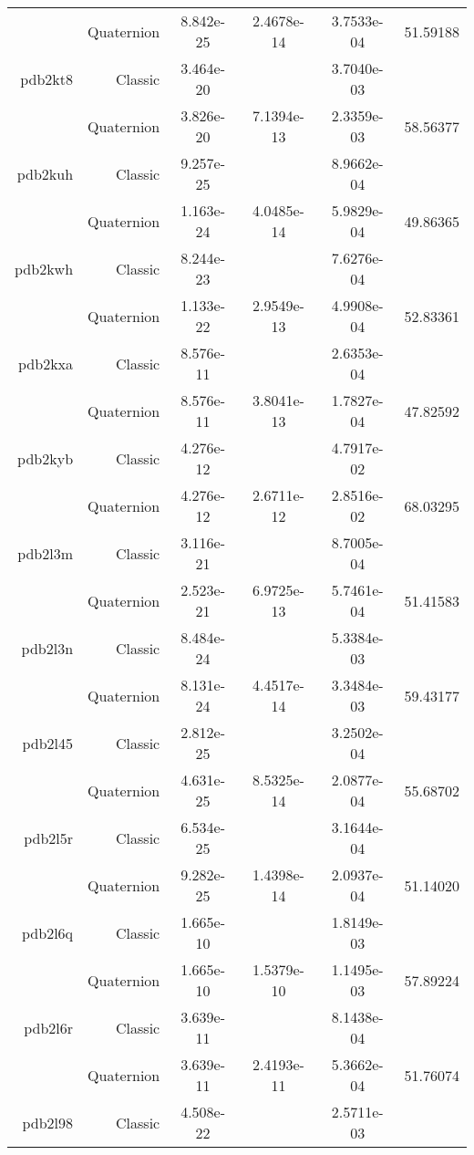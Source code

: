 \begin{xltabular}{\textwidth}{r|rS[table-format=1.3e+2]S[table-format=1.4e+2]S[table-format=1.4e+2]S[table-format=-1.5]}
& Quaternion & 8.842e-25 & 2.4678e-14 & 3.7533e-04 & 51.59188\\  \addlinespace
pdb2kt8 & Classic & 3.464e-20 &  & 3.7040e-03 & \\
& Quaternion & 3.826e-20 & 7.1394e-13 & 2.3359e-03 & 58.56377\\  \addlinespace
pdb2kuh & Classic & 9.257e-25 &  & 8.9662e-04 & \\
& Quaternion & 1.163e-24 & 4.0485e-14 & 5.9829e-04 & 49.86365\\  \addlinespace
pdb2kwh & Classic & 8.244e-23 &  & 7.6276e-04 & \\
& Quaternion & 1.133e-22 & 2.9549e-13 & 4.9908e-04 & 52.83361\\  \addlinespace
pdb2kxa & Classic & 8.576e-11 &  & 2.6353e-04 & \\
& Quaternion & 8.576e-11 & 3.8041e-13 & 1.7827e-04 & 47.82592\\  \addlinespace
pdb2kyb & Classic & 4.276e-12 &  & 4.7917e-02 & \\
& Quaternion & 4.276e-12 & 2.6711e-12 & 2.8516e-02 & 68.03295\\  \addlinespace
pdb2l3m & Classic & 3.116e-21 &  & 8.7005e-04 & \\
& Quaternion & 2.523e-21 & 6.9725e-13 & 5.7461e-04 & 51.41583\\  \addlinespace
pdb2l3n & Classic & 8.484e-24 &  & 5.3384e-03 & \\
& Quaternion & 8.131e-24 & 4.4517e-14 & 3.3484e-03 & 59.43177\\  \addlinespace
pdb2l45 & Classic & 2.812e-25 &  & 3.2502e-04 & \\
& Quaternion & 4.631e-25 & 8.5325e-14 & 2.0877e-04 & 55.68702\\  \addlinespace
pdb2l5r & Classic & 6.534e-25 &  & 3.1644e-04 & \\
& Quaternion & 9.282e-25 & 1.4398e-14 & 2.0937e-04 & 51.14020\\  \addlinespace
pdb2l6q & Classic & 1.665e-10 &  & 1.8149e-03 & \\
& Quaternion & 1.665e-10 & 1.5379e-10 & 1.1495e-03 & 57.89224\\  \addlinespace
pdb2l6r & Classic & 3.639e-11 &  & 8.1438e-04 & \\
& Quaternion & 3.639e-11 & 2.4193e-11 & 5.3662e-04 & 51.76074\\  \addlinespace
pdb2l98 & Classic & 4.508e-22 &  & 2.5711e-03 & \\

\end{xltabular}
